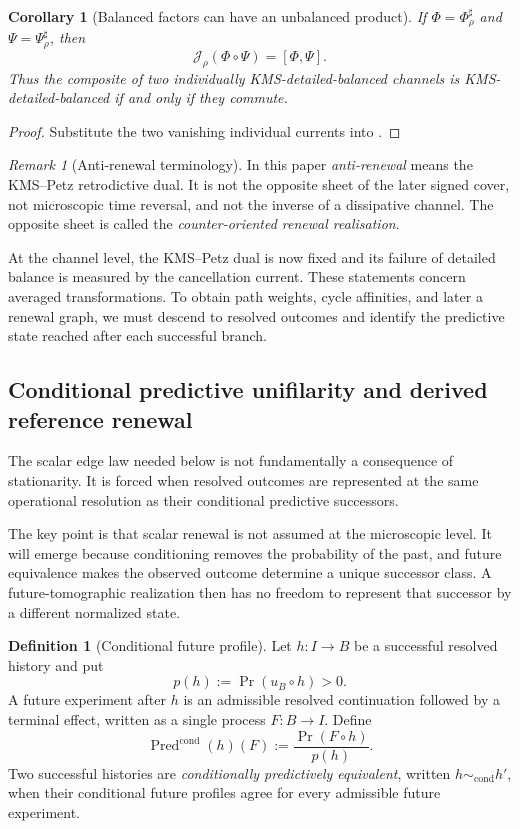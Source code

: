 \documentclass[11pt]{article}
\newtheorem{corollary}[theorem]{Corollary}
\theoremstyle{definition}
\newtheorem{definition}[theorem]{Definition}
\theoremstyle{remark}
\newtheorem{remark}[theorem]{Remark}
\newcommand{\Pred}{\operatorname{Pred}}
\begin{document}
\begin{corollary}[Balanced factors can have an unbalanced product]
\label{cor:balanced-product}
If $\Phi=\Phi_\rho^\sharp$ and $\Psi=\Psi_\rho^\sharp$, then
\[
 \mathcal J_\rho(\Phi\circ\Psi)=[\Phi,\Psi].
\]
Thus the composite of two individually KMS-detailed-balanced channels is
KMS-detailed-balanced if and only if they commute.
\end{corollary}

\begin{proof}
Substitute the two vanishing individual currents into
.
\end{proof}

\begin{remark}[Anti-renewal terminology]
In this paper \emph{anti-renewal} means the KMS--Petz retrodictive dual.  It is
not the opposite sheet of the later signed cover, not microscopic time
reversal, and not the inverse of a dissipative channel.  The opposite sheet is
called the \emph{counter-oriented renewal realisation}.
\end{remark}


At the channel level, the KMS--Petz dual is now fixed and its failure of detailed
balance is measured by the cancellation current.  These statements concern
averaged transformations.  To obtain path weights, cycle affinities, and later a
renewal graph, we must descend to resolved outcomes and identify the predictive
state reached after each successful branch.

\subsection{Conditional predictive unifilarity and derived reference renewal}
\label{subsec:conditional-reference-renewal}

The scalar edge law needed below is not fundamentally a consequence of
stationarity.  It is forced when resolved outcomes are represented at the same
operational resolution as their conditional predictive successors.

The key point is that scalar renewal is not assumed at the microscopic level.  It
will emerge because conditioning removes the probability of the past, and future
equivalence makes the observed outcome determine a unique successor class.  A
future-tomographic realization then has no freedom to represent that successor by
a different normalized state.

\begin{definition}[Conditional future profile]
\label{def:conditional-future-profile}
Let $h:I\to B$ be a successful resolved history and put
\[
 p(h):=\Pr(u_B\circ h)>0.
\]
A future experiment after $h$ is an admissible resolved continuation followed
by a terminal effect, written as a single process $F:B\to I$.  Define
\[
 \Pred^{\mathrm{cond}}(h)(F)
 :=\frac{\Pr(F\circ h)}{p(h)}.
\]
Two successful histories are \emph{conditionally predictively equivalent},
written $h\sim_{\mathrm{cond}}h'$, when their conditional future profiles agree
for every admissible future experiment.
\end{definition}
\end{document}
